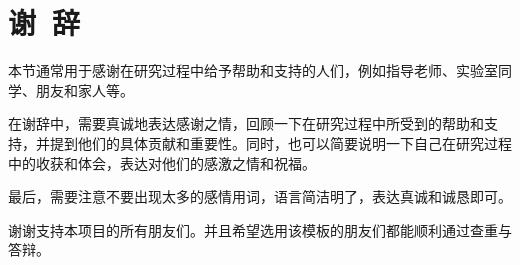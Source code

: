 \section*{谢\ 辞}

本节通常用于感谢在研究过程中给予帮助和支持的人们，例如指导老师、实验室同学、朋友和家人等。

在谢辞中，需要真诚地表达感谢之情，回顾一下在研究过程中所受到的帮助和支持，并提到他们的具体贡献和重要性。同时，也可以简要说明一下自己在研究过程中的收获和体会，表达对他们的感激之情和祝福。

最后，需要注意不要出现太多的感情用词，语言简洁明了，表达真诚和诚恳即可。

谢谢支持本项目的所有朋友们。并且希望选用该模板的朋友们都能顺利通过查重与答辩。
